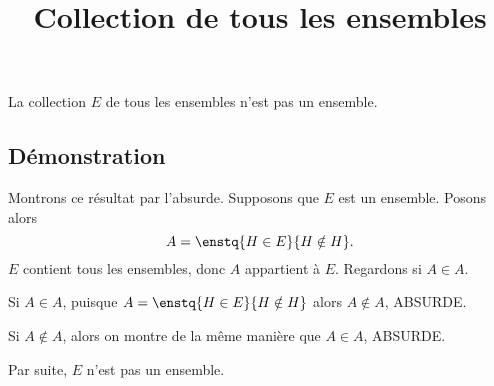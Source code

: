 \documentclass[fontsize=12pt,twoside=false,parskip=half]{scrartcl}
\title{Collection de tous les ensembles}
\date{}
\author{}
\begin{document}
\maketitle
   \begin{Theoreme}
      La collection $E$ de tous les ensembles n’est pas un ensemble.
   \end{Theoreme}
   \subsection{Démonstration}
      Montrons ce résultat par l’absurde. Supposons que $E$ est un ensemble.
      Posons alors
      \[
         A = \enstq{H \in E}{H \notin H}.
      \]
      $E$ contient tous les ensembles, donc $A$ appartient à $E$. Regardons si $A \in A$.
      \begin{description}
         \item Si $A \in A$, puisque $A = \enstq{H \in E}{H \notin H}$ alors  $A \not \in A$, ABSURDE.
         \item Si $A \not \in A$, alors on montre de la même manière que $A \in A$, ABSURDE.
      \end{description}
      Par suite, $E$ n’est pas un ensemble.
\end{document}
